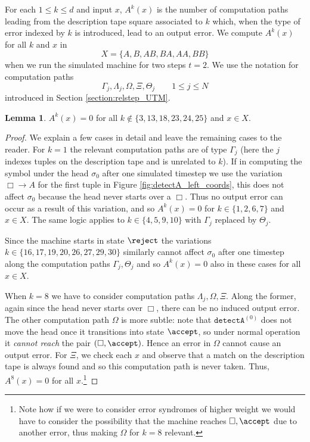 \documentclass[english,letter paper,12pt,reqno]{article}
\theoremstyle{definition}
\newtheorem{lemma}[theorem]{Lemma}
\newcommand{\detectA}{\texttt{detectA}}
\def\be{\begin{equation}}
\def\ee{\end{equation}}
\begin{document}
For each $1 \le k \le d$ and input $x$, $A^k(x)$ is the number of computation paths leading from the description tape square associated to $k$ which, when the type of error indexed by $k$ is introduced, lead to an output error. We compute $A^k(x)$ for all $k$ and $x$ in
\be\label{eq:input_set_X}
X = \{ A, B, AB, BA, AA, BB \}
\ee
when we run the simulated machine for two steps $t = 2$. We use the notation for computation paths
\[
\Gamma_j, \Lambda_j, \Omega, \Xi, \Theta_j \qquad 1 \le j \le N
\]
introduced in Section \ref{section:relstep_UTM}.

\begin{lemma}\label{lemma:irrelevant_entries_channel}
$A^k(x) = 0$ for all $k \notin \{3, 13, 18, 23, 24, 25\}$ and $x \in X$.    
\end{lemma}
\begin{proof}
We explain a few cases in detail and leave the remaining cases to the reader. For $k = 1$ the relevant computation paths are of type $\Gamma_j$ (here the $j$ indexes tuples on the description tape and is unrelated to $k$). If in computing the symbol under the head $\sigma_0$ after one simulated timestep we use the variation $\Box \rightarrow A$ for the first tuple in Figure \ref{fig:detectA_left_coords}, this does not affect $\sigma_0$ because the head never starts over a $\Box$. Thus no output error can occur as a result of this variation, and so $A^k(x) = 0$ for $k \in \{1,2,6,7\}$ and $x \in X$. The same logic applies to $k \in \{4,5,9,10\}$ with $\Gamma_j$ replaced by $\Theta_j$.

Since the machine starts in state $\reject$ the variations $k \in \{16, 17,19,20,26,27,29,30\}$ similarly cannot affect $\sigma_0$ after one timestep along the computation paths $\Gamma_j, \Theta_j$ and so $A^k(x) = 0$ also in these cases for all $x \in X$.

When $k = 8$ we have to consider computation paths $\Lambda_j, \Omega, \Xi$. Along the former, again since the head never starts over $\Box$, there can be no induced output error. The other computation path $\Omega$ is more subtle: note that $\detectA^{(0)}$ does not move the head once it transitions into state $\accept$, so under normal operation it \emph{cannot reach} the pair $(\Box, \accept)$. Hence an error in $\Omega$ cannot cause an output error. For $\Xi$, we check each $x$ and observe that a match on the description tape is always found and so this computation path is never taken. Thus, $A^{8}(x) = 0$ for all $x$.\footnote{Note how if we were to consider error syndromes of higher weight we would have to consider the possibility that the machine reaches $\Box, \accept$ due to another error, thus making $\Omega$ for $k = 8$ relevant.}


\end{proof}
\end{document}
